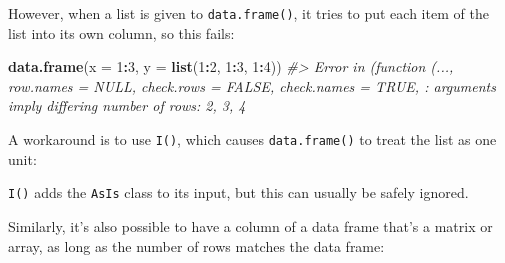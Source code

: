 \documentclass[]{book}
\newenvironment{Shaded}{\begin{snugshade}}{\end{snugshade}}
\newcommand{\KeywordTok}[1]{\textcolor[rgb]{0.13,0.29,0.53}{\textbf{#1}}}
\newcommand{\DataTypeTok}[1]{\textcolor[rgb]{0.13,0.29,0.53}{#1}}
\newcommand{\DecValTok}[1]{\textcolor[rgb]{0.00,0.00,0.81}{#1}}
\newcommand{\StringTok}[1]{\textcolor[rgb]{0.31,0.60,0.02}{#1}}
\newcommand{\CommentTok}[1]{\textcolor[rgb]{0.56,0.35,0.01}{\textit{#1}}}
\newcommand{\OperatorTok}[1]{\textcolor[rgb]{0.81,0.36,0.00}{\textbf{#1}}}
\newcommand{\NormalTok}[1]{#1}
\theoremstyle{definition}
\theoremstyle{definition}
\theoremstyle{definition}
\theoremstyle{remark}
\begin{document}
However, when a list is given to \texttt{data.frame()}, it tries to put
each item of the list into its own column, so this fails:

\begin{Shaded}
\begin{Highlighting}[]
\KeywordTok{data.frame}\NormalTok{(}\DataTypeTok{x =} \DecValTok{1}\OperatorTok{:}\DecValTok{3}\NormalTok{, }\DataTypeTok{y =} \KeywordTok{list}\NormalTok{(}\DecValTok{1}\OperatorTok{:}\DecValTok{2}\NormalTok{, }\DecValTok{1}\OperatorTok{:}\DecValTok{3}\NormalTok{, }\DecValTok{1}\OperatorTok{:}\DecValTok{4}\NormalTok{))}
\CommentTok{#> Error in (function (..., row.names = NULL, check.rows = FALSE, check.names = TRUE, : arguments imply differing number of rows: 2, 3, 4}
\end{Highlighting}
\end{Shaded}

A workaround is to use \texttt{I()}, which causes \texttt{data.frame()}
to treat the list as one unit:

\begin{Shaded}
\end{Shaded}

\texttt{I()} adds the \texttt{AsIs} class to its input, but this can
usually be safely ignored.

Similarly, it's also possible to have a column of a data frame that's a
matrix or array, as long as the number of rows matches the data frame:

\begin{Shaded}
\end{Shaded}
\end{document}
